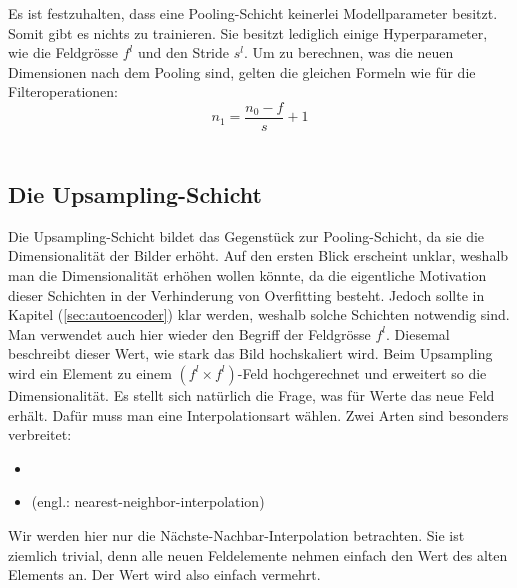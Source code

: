 \para{}
Es ist festzuhalten, dass eine Pooling-Schicht keinerlei Modellparameter
besitzt. Somit gibt es nichts zu trainieren. Sie besitzt lediglich einige
Hyperparameter, wie die Feldgrösse $f^l$ und den Stride $s^l$.
\para{}
Um zu berechnen, was die neuen Dimensionen nach dem Pooling sind, gelten die
gleichen Formeln wie für die Filteroperationen:
\\
\begin{equation}
  n_1 = \frac{n_0 - f}{s} + 1
\end{equation}
\\


\cite{deeplearning.ai:cnn}
\cite{Goodfellow-et-al-2016}

\subsection{Die Upsampling-Schicht}
Die Upsampling-Schicht bildet das Gegenstück zur Pooling-Schicht, da sie die
Dimensionalität der Bilder erhöht. Auf den ersten Blick erscheint unklar,
weshalb man die Dimensionalität erhöhen wollen könnte, da die eigentliche
Motivation dieser Schichten in der Verhinderung von Overfitting besteht. Jedoch
sollte in Kapitel (\ref{sec:autoencoder}) klar werden, weshalb solche Schichten
notwendig sind.
\para{}
Man verwendet auch hier wieder den Begriff der Feldgrösse $f^l$. Diesemal
beschreibt dieser Wert, wie stark das Bild hochskaliert wird. Beim Upsampling
wird ein Element zu einem $(f^l \times f^l)$-Feld hochgerechnet und erweitert so die
Dimensionalität.
\para{}
Es stellt sich natürlich die Frage, was für Werte das neue Feld erhält.
Dafür muss man eine Interpolationsart wählen.
Zwei Arten sind besonders verbreitet:
\begin{itemize}
\item{}
\item{ (engl.: nearest-neighbor-interpolation)}
\end{itemize}
Wir werden hier nur die Nächste-Nachbar-Interpolation betrachten. Sie ist
ziemlich trivial, denn alle neuen Feldelemente nehmen einfach den Wert des alten
Elements an. Der Wert wird also einfach vermehrt.


\cite{deeplearning.ai:cnn}
\cite{Goodfellow-et-al-2016}

\pagebreak
